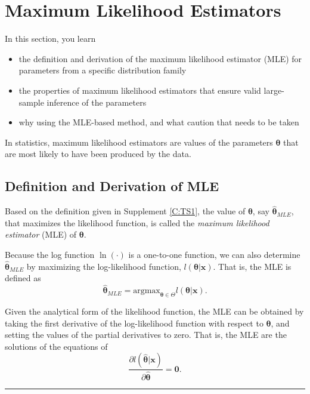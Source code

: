 \documentclass[]{book}
\providecommand{\tightlist}{%
  \setlength{\itemsep}{0pt}\setlength{\parskip}{0pt}}
\theoremstyle{definition}
\theoremstyle{definition}
\theoremstyle{definition}
\theoremstyle{remark}
\begin{document}
\section{Maximum Likelihood Estimators}\label{S:TS2b:MLE}

In this section, you learn

\begin{itemize}
\tightlist
\item
  the definition and derivation of the maximum likelihood estimator
  (MLE) for parameters from a specific distribution family
\item
  the properties of maximum likelihood estimators that ensure valid
  large-sample inference of the parameters
\item
  why using the MLE-based method, and what caution that needs to be
  taken
\end{itemize}

In statistics, maximum likelihood estimators are values of the
parameters \(\boldsymbol \theta\) that are most likely to have been
produced by the data.

\subsection{Definition and Derivation of
MLE}\label{definition-and-derivation-of-mle}

Based on the definition given in Supplement \ref{C:TS1}, the value of
\(\boldsymbol \theta\), say \(\hat{\boldsymbol \theta}_{MLE}\), that
maximizes the likelihood function, is called the \emph{maximum
likelihood estimator} (MLE) of \(\boldsymbol \theta\).

Because the log function \(\ln(\cdot)\) is a one-to-one function, we can
also determine \(\hat{\boldsymbol{\theta}}_{MLE}\) by maximizing the
log-likelihood function, \(l(\boldsymbol \theta|\mathbf{x})\). That is,
the MLE is defined as
\[\hat{\boldsymbol \theta}_{MLE}={\mbox{argmax}}_{\boldsymbol{\theta}\in\Theta}l(\boldsymbol{\theta}|\mathbf{x}).\]

Given the analytical form of the likelihood function, the MLE can be
obtained by taking the first derivative of the log-likelihood function
with respect to \(\boldsymbol{\theta}\), and setting the values of the
partial derivatives to zero. That is, the MLE are the solutions of the
equations of
\[\frac{\partial l(\hat{\boldsymbol{\theta}}|\mathbf{x})}{\partial\hat{\boldsymbol{\theta}}}=\mathbf 0.\]

\begin{center}\rule{0.5\linewidth}{\linethickness}\end{center}
\end{document}

